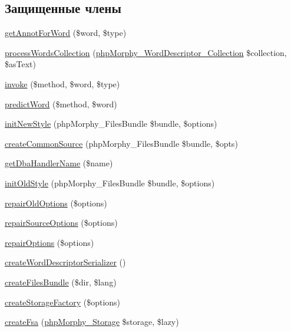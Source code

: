 \subsection*{Защищенные члены}
\begin{DoxyCompactItemize}
\item 
\hyperlink{classphpMorphy_a0e6dfbda7127ec57b65714463f84d703}{getAnnotForWord} (\$word, \$type)
\item 
\hyperlink{classphpMorphy_aa9fc29c9fede88464b3696a20fb0ea7f}{processWordsCollection} (\hyperlink{classphpMorphy__WordDescriptor__Collection}{phpMorphy\_\-WordDescriptor\_\-Collection} \$collection, \$asText)
\item 
\hyperlink{classphpMorphy_a5fce126e953fc4317a2ffe9c39fc01b7}{invoke} (\$method, \$word, \$type)
\item 
\hyperlink{classphpMorphy_af055c5fae7f8de6c37a011e86594995f}{predictWord} (\$method, \$word)
\item 
\hyperlink{classphpMorphy_ae5eba4519ae7d1692314a785fea4d5fd}{initNewStyle} (phpMorphy\_\-FilesBundle \$bundle, \$options)
\item 
\hyperlink{classphpMorphy_a645c8acabfc4300ef5a723201e01d138}{createCommonSource} (phpMorphy\_\-FilesBundle \$bundle, \$opts)
\item 
\hyperlink{classphpMorphy_af11804fd579bc168811d9bb1cfb8afff}{getDbaHandlerName} (\$name)
\item 
\hyperlink{classphpMorphy_ab8d41deae8cbf5c7b378105c466e2faa}{initOldStyle} (phpMorphy\_\-FilesBundle \$bundle, \$options)
\item 
\hyperlink{classphpMorphy_a3ba28dac1c785398ae1a6c112a2f884e}{repairOldOptions} (\$options)
\item 
\hyperlink{classphpMorphy_ade6f92bfb7f236ca01a37c7ea3edba06}{repairSourceOptions} (\$options)
\item 
\hyperlink{classphpMorphy_a968bfb227dd3b721632b01d92d56f3b6}{repairOptions} (\$options)
\item 
\hyperlink{classphpMorphy_afbdc7fb761786bc1c16a8e8df6db5298}{createWordDescriptorSerializer} ()
\item 
\hyperlink{classphpMorphy_a85af9a85d71c81646e8d5e2babc885cf}{createFilesBundle} (\$dir, \$lang)
\item 
\hyperlink{classphpMorphy_afa44e3844366b8ca77a91b7e2de2a17f}{createStorageFactory} (\$options)
\item 
\hyperlink{classphpMorphy_ad2020c1fdba569d53bec3d7544fc6e91}{createFsa} (\hyperlink{classphpMorphy__Storage}{phpMorphy\_\-Storage} \$storage, \$lazy)

\end{DoxyCompactItemize}
